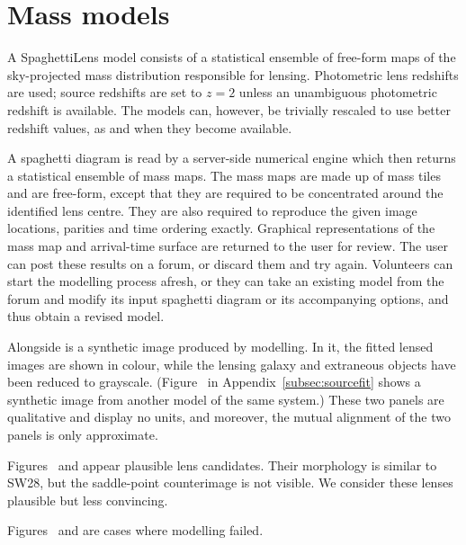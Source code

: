 \section{Mass models}\label{sec:massmodels}

A SpaghettiLens model consists of a statistical ensemble of free-form
maps of the sky-projected mass distribution responsible for lensing.
  Photometric lens
redshifts are used; source redshifts are set to $z=2$ unless an
unambiguous photometric redshift is available.  The models can,
however, be trivially rescaled to use better redshift values, as and
when they become available.

A spaghetti diagram is read by a server-side numerical engine
\citep[GLASS, developed by][]{2014MNRAS.445.2181C} which then returns
a statistical ensemble of mass maps.  The mass maps are made up of
mass tiles and are free-form, except that they are required to be
concentrated around the identified lens centre.  They are also
required to reproduce the given image locations, parities and time
ordering exactly.  Graphical representations of the mass map and
arrival-time surface are returned to the user for review.  The user
can post these results on a forum, or discard them and try again.
Volunteers can start the modelling process afresh, or they can take an
existing model from the forum and modify its input spaghetti diagram
or its accompanying options, and thus obtain a revised model.

Alongside is a synthetic image produced by modelling.  In it, the
fitted lensed images are shown in colour, while the lensing galaxy and
extraneous objects have been reduced to grayscale.
(Figure~ in Appendix~\ref{subsec:sourcefit} shows a
synthetic image from another model of the same system.) These two
panels are qualitative and display no units, and moreover, the mutual
alignment of the two panels is only approximate.

Figures~ and  appear plausible lens
candidates.  Their morphology is similar to SW28, but the saddle-point
counterimage is not visible.  We consider these lenses plausible but
less convincing.

Figures~ and  are cases where modelling
failed.

